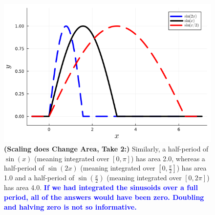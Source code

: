 \begin{figure}[htb]%
\centering
\includegraphics[width=0.6\columnwidth]{graphics/Chap03/IntegratingScaledSinusoidOverOnePeriod.png}
    \caption[]{
    \textbf{(Scaling does Change Area, Take 2:)} Similarly, a half-period of $\sin(x)$ (meaning integrated over $[0, \pi]$) has area 2.0, whereas a half-period of $\sin(2x)$ (meaning integrated over $[0, \frac{\pi}{2}]$) has area 1.0 and a half-period of $\sin(\frac{x}{2})$ (meaning integrated over $[0, 2 \pi]$) has area 4.0. \textcolor{blue}{\bf If we had integrated the sinusoids over a full period, all of the answers would have been zero. Doubling and halving zero is not so informative.}
    }
    \label{fig:ScalingAndIntegration02}
\end{figure}



